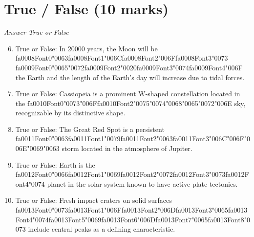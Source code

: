 \documentclass[12pt]{article}
\begin{document}
\section*{True / False (10 marks)}
\textit{Answer True or False}
\begin{enumerate}[label=\arabic*.]
\setcounter{enumi}{5}
\item True or False: In 20000 years, the Moon will be {\csname fa0008Font0\endcsname\char"0063}{\csname fa0008Font1\endcsname\char"006C}{\csname fa0008Font2\endcsname\char"006F}{\csname fa0008Font3\endcsname\char"0073} {\csname fa0009Font0\endcsname\char"0065}{\char"0072}{\csname fa0009Font2\endcsname\char"0020}{\csname fa0009Font3\endcsname\char"0074}{\csname fa0009Font4\endcsname\char"006F} the Earth and the length of the Earth's day will increase due to tidal forces.
\item True or False: Cassiopeia is a prominent W-shaped constellation located in the {\csname fa0010Font0\endcsname\char"0073}{\char"006F}{\csname fa0010Font2\endcsname\char"0075}{\char"0074}{\char"0068}{\char"0065}{\char"0072}{\char"006E} sky, recognizable by its distinctive shape.
\item True or False: The Great Red Spot is a persistent {\csname fa0011Font0\endcsname\char"0063}{\csname fa0011Font1\endcsname\char"0079}{\csname fa0011Font2\endcsname\char"0063}{\csname fa0011Font3\endcsname\char"006C}{\char"006F}{\char"006E}{\char"0069}{\char"0063} storm located in the atmosphere of Jupiter.
\item True or False: Earth is the {\csname fa0012Font0\endcsname\char"0066}{\csname fa0012Font1\endcsname\char"0069}{\csname fa0012Font2\endcsname\char"0072}{\csname fa0012Font3\endcsname\char"0073}{\csname fa0012Font4\endcsname\char"0074} planet in the solar system known to have active plate tectonics.
\item True or False: Fresh impact craters on solid surfaces {\csname fa0013Font0\endcsname\char"0073}{\csname fa0013Font1\endcsname\char"006F}{\csname fa0013Font2\endcsname\char"006D}{\csname fa0013Font3\endcsname\char"0065}{\csname fa0013Font4\endcsname\char"0074}{\csname fa0013Font5\endcsname\char"0069}{\csname fa0013Font6\endcsname\char"006D}{\csname fa0013Font7\endcsname\char"0065}{\csname fa0013Font8\endcsname\char"0073} include central peaks as a defining characteristic.
\end{enumerate}
\end{document}
